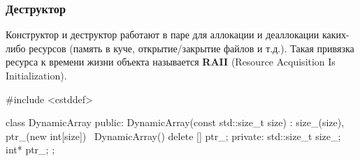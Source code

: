 \documentclass[compress, 8pt]{beamer}
\begin{document}
\begin{frame}[fragile]

    \frametitle{Деструктор}

    Конструктор и деструктор работают в паре для аллокации и деаллокации
    каких-либо ресурсов (память в куче, открытие/закрытие файлов и т.д.).
    Такая привязка ресурса к времени жизни объекта называется \textbf{RAII}\footnotemark{}
    (Resource Acquisition Is Initialization).


    \begin{myinplacelisting}[minted language=cpp]
#include <cstddef>

class DynamicArray {
public:
    DynamicArray(const std::size_t size) :
        size_(size), ptr_(new int[size]) {}
    ~DynamicArray() {
        delete [] ptr_;
    }
private:
    std::size_t size_;
    int* ptr_;
};
    \end{myinplacelisting}

\end{frame}
\end{document}
